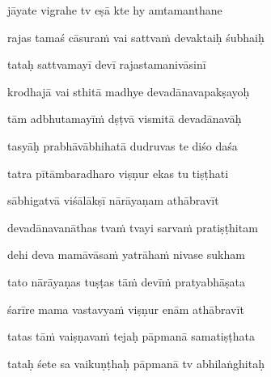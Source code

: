 jāyate vigrahe tv eṣā kte hy amtamanthane\thinspace{\dandab} \dontdisplaylinenum

rajas tamaś cāsuraṁ vai sattvaṁ devaktaiḥ śubhaiḥ \veg\dontdisplaylinenum

tataḥ sattvamayī devī rajastamanivāsinī\thinspace{\dandab} \dontdisplaylinenum

krodhajā vai sthitā madhye devadānavapakṣayoḥ \veg\dontdisplaylinenum
{}

tām adbhutamayīṁ dṣṭvā vismitā devadānavāḥ\thinspace{\dandab} \dontdisplaylinenum

tasyāḥ prabhāvābhihatā dudruvas te diśo daśa \veg\dontdisplaylinenum
{}

tatra pītāmbaradharo viṣṇur ekas tu tiṣṭhati\thinspace{\dandab} \dontdisplaylinenum

sābhigatvā viśālākṣī nārāyaṇam athābravīt \veg\dontdisplaylinenum
{}

devadānavanāthas tvaṁ tvayi sarvaṁ pratiṣṭhitam\thinspace{\dandab} \dontdisplaylinenum

dehi deva mamāvāsaṁ yatrāhaṁ nivase sukham \veg\dontdisplaylinenum
{}

tato nārāyaṇas tuṣṭas tāṁ devīṁ pratyabhāṣata\thinspace{\dandab} \dontdisplaylinenum

śarīre mama vastavyaṁ viṣṇur enām athābravīt \veg\dontdisplaylinenum
{}

tatas tāṁ vaiṣṇavaṁ tejaḥ pāpmanā samatiṣṭhata\thinspace{\dandab} \dontdisplaylinenum

tataḥ śete sa vaikuṇṭhaḥ pāpmanā tv abhilaṅghitaḥ \veg\dontdisplaylinenum
{}

